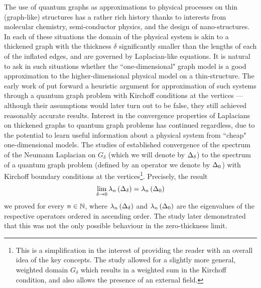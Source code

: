 The use of quantum graphs as approximations to physical processes on thin (graph-like) structures has a rather rich history thanks to interests from molecular chemistry, semi-conductor physics, and the design of nano-structures.
In each of these situations the domain of the physical system is akin to a thickened graph with the thickness $\delta$ significantly smaller than the lengths of each of the inflated edges, and are governed by Laplacian-like equations.
It is natural to ask in such situations whether the ``one-dimensional" graph model is a good approximation to the higher-dimensional physical model on a thin-structure.
The early work of \cite{ruedenberg1953free} put forward a heuristic argument for approximation of such systems through a quantum graph problem with Kirchoff conditions at the vertices --- although their assumptions would later turn out to be false, they still achieved reasonably accurate results.
Interest in the convergence properties of Laplacians on thickened graphs to quantum graph problems has continued regardless, due to the potential to learn useful information about a physical system from ``cheap" one-dimensional models.
The studies of \cite{rubinstein2001variational, kuchment2001convergence} established convergence of the spectrum of the Neumann Laplacian on $G_{\delta}$ (which we will denote by $\Delta_{\delta}$) to the spectrum of a quantum graph problem (defined by an operator we denote by $\Delta_0$) with Kirchoff boundary conditions at the vertices\footnote{This is a simplification in the interest of providing the reader with an overall idea of the key concepts. The study \cite{kuchment2001convergence} allowed for a slightly more general, weighted domain $G_{\delta}$ which results in a weighted sum in the Kirchoff condition, and also allows the presence of an external field.}.
Precisely, the result
\begin{align*}
	\lim_{\delta\rightarrow0} \lambda_n\left( \Delta_{\delta} \right) = \lambda_n\left( \Delta_0 \right)
\end{align*}
we proved for every $n\in\mathbb{N}$, where $\lambda_n\left( \Delta_{\delta} \right)$ and $\lambda_n\left( \Delta_0 \right)$ are the eigenvalues of the respective operators ordered in ascending order.
The study \cite{kuchment2003asymptotics} later demonstrated that this was not the only possible behaviour in the zero-thickness limit.

